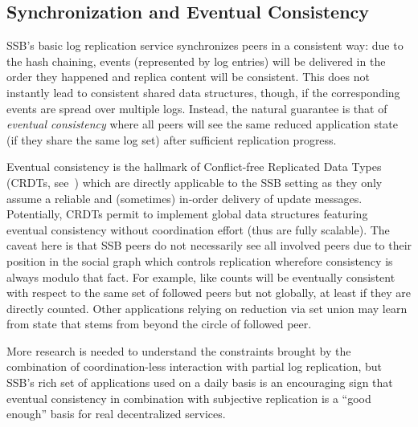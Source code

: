 \documentclass[10pt,sigconf,rewiew]{acmart}
\begin{document}

\subsection{Synchronization and Eventual Consistency}
\label{Section:Tangle}

SSB's basic log replication service synchronizes peers in a consistent
way: due to the hash chaining, events (represented by log entries)
will be delivered in the order they happened and replica content will
be consistent. This does not instantly lead to consistent shared data
structures, though, if the corresponding events are spread over
multiple logs. Instead, the natural guarantee is that of {\em eventual
  consistency} where all peers will see the same reduced application
state (if they share the same log set) after sufficient replication
progress.

Eventual consistency is the hallmark of Conflict-free Replicated Data
Types (CRDTs, see~\cite{shapiro2011conflict}) which are directly applicable to the SSB
setting as they only assume a reliable and (sometimes) in-order
delivery of update messages. Potentially, CRDTs permit to implement
global data structures featuring eventual consistency without
coordination effort (thus are fully scalable). The caveat here is that
SSB peers do not necessarily see all involved peers due to their
position in the social graph which controls replication wherefore
consistency is always modulo that fact. For example, like counts will
be eventually consistent with respect to the same set of followed
peers but not globally, at least if they are directly counted. Other
applications relying on reduction via set union may learn from state
that stems from beyond the circle of followed peer. 

More research is needed to understand the constraints brought by the combination of
coordination-less interaction with partial log replication, but SSB's
rich set of applications used on a daily basis is an encouraging sign
that eventual consistency in combination with subjective replication
is a ``good enough'' basis for real decentralized services.
\end{document}
